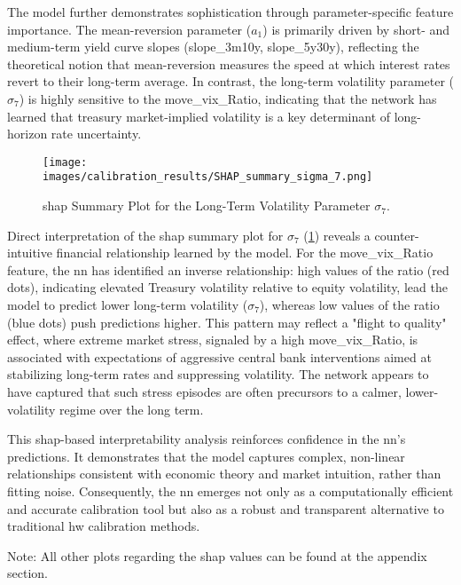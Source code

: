 The model further demonstrates sophistication through parameter-specific feature importance. The mean-reversion parameter (\(a_1\)) is primarily driven by short- and medium-term yield curve slopes (slope\_3m10y, slope\_5y30y), reflecting the theoretical notion that mean-reversion measures the speed at which interest rates revert to their long-term average. In contrast, the long-term volatility parameter (\(\sigma_7\)) is highly sensitive to the \ac{move}\_\ac{vix}\_Ratio, indicating that the network has learned that treasury market-implied volatility is a key determinant of long-horizon rate uncertainty.

\begin{figure}[H]
	\centering
	\texttt{[image: images/calibration\_results/SHAP\_summary\_sigma\_7.png]}
	\caption{\ac{shap} Summary Plot for the Long-Term Volatility Parameter \(\sigma_7\).}
	\label{fig:shap_summary_sigma_7}
\end{figure}

Direct interpretation of the \ac{shap} summary plot for \(\sigma_7\) (\ref{fig:shap_summary_sigma_7}) reveals a counter-intuitive financial relationship learned by the model. For the \ac{move}\_\ac{vix}\_Ratio feature, the \ac{nn} has identified an inverse relationship: high values of the ratio (red dots), indicating elevated Treasury volatility relative to equity volatility, lead the model to predict lower long-term volatility (\(\sigma_7\)), whereas low values of the ratio (blue dots) push predictions higher. This pattern may reflect a "flight to quality" effect, where extreme market stress, signaled by a high \ac{move}\_\ac{vix}\_Ratio, is associated with expectations of aggressive central bank interventions aimed at stabilizing long-term rates and suppressing volatility. The network appears to have captured that such stress episodes are often precursors to a calmer, lower-volatility regime over the long term.


This \ac{shap}-based interpretability analysis reinforces confidence in the \ac{nn}'s predictions. It demonstrates that the model captures complex, non-linear relationships consistent with economic theory and market intuition, rather than fitting noise. Consequently, the \ac{nn} emerges not only as a computationally efficient and accurate calibration tool but also as a robust and transparent alternative to traditional \ac{hw} calibration methods.

Note: All other plots regarding the \ac{shap} values can be found at the appendix section.

